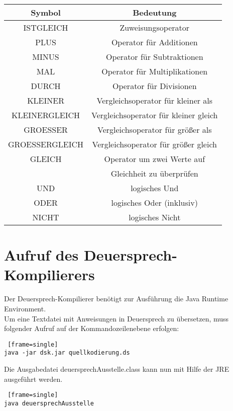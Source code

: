 \documentclass[12pt, a4paper, oneside, ngerman]{article}
\begin{document}
\begin{center}
  \begin{tabular}{ | c | c | }
    \hline
    Symbol & Bedeutung\\ \hline \hline
    ISTGLEICH & Zuweisungsoperator\\ \hline
    PLUS & Operator für Additionen\\ \hline
    MINUS & Operator für Subtraktionen\\ \hline
    MAL & Operator für Multiplikationen\\ \hline
    DURCH & Operator für Divisionen\\ \hline
    
    KLEINER & Vergleichsoperator für kleiner als\\ \hline
    KLEINERGLEICH & Vergleichsoperator für kleiner gleich\\ \hline
    GROESSER & Vergleichsoperator für größer als\\ \hline
    GROESSERGLEICH & Vergleichsoperator für größer gleich\\ \hline    
    GLEICH & Operator um zwei Werte auf \\
            & Gleichheit zu überprüfen\\ \hline    
    
    UND  & logisches Und \\ \hline    
    ODER & logisches Oder (inklusiv) \\ \hline    
    NICHT & logisches Nicht \\ \hline    
    
  \end{tabular}
\end{center}
  
\pagebreak
\section{Aufruf des Deuersprech-Kompilierers}
Der Deuersprech-Kompilierer benötigt zur Ausführung die Java Runtime Environment.\\
Um eine Textdatei mit Anweisungen in Deuersprech zu übersetzen, muss folgender Aufruf auf der Kommandozeilenebene erfolgen:
\begin{lstlisting} [frame=single]
java -jar dsk.jar quellkodierung.ds 
\end{lstlisting}
Die Ausgabedatei deuersprechAusstelle.class kann nun mit Hilfe der JRE ausgeführt werden.
\begin{lstlisting} [frame=single]
java deuersprechAusstelle
\end{lstlisting}
\end{document}
